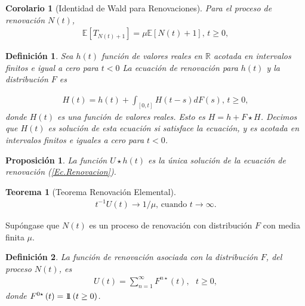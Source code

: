 \documentclass{article}
\newtheorem{Def}{Definición}
\newtheorem{Teo}{Teorema}
\newtheorem{Prop}{Proposición}
\newtheorem{Coro}{Corolario}
\newcommand{\rea}{\mathbb{R}}
\newcommand{\esp}{\mathbb{E}}
\newcommand{\indora}{\mbox{$1$\hspace{-0.8ex}$1$}}
\begin{document}
\begin{Coro}[Identidad de Wald para Renovaciones]
Para el proceso de renovaci\'on $N\left(t\right)$,
\begin{eqnarray*}
\esp\left[T_{N\left(t\right)+1}\right]=\mu\esp\left[N\left(t\right)+1\right]\textrm{,  }t\geq0,
\end{eqnarray*}  
\end{Coro}


\begin{Def}
Sea $h\left(t\right)$ funci\'on de valores reales en $\rea$ acotada en intervalos finitos e igual a cero para $t<0$ La ecuaci\'on de renovaci\'on para $h\left(t\right)$ y la distribuci\'on $F$ es

\begin{eqnarray}\label{Ec.Renovacion}
H\left(t\right)=h\left(t\right)+\int_{\left[0,t\right]}H\left(t-s\right)dF\left(s\right)\textrm{,    }t\geq0,
\end{eqnarray}
donde $H\left(t\right)$ es una funci\'on de valores reales. Esto es $H=h+F\star H$. Decimos que $H\left(t\right)$ es soluci\'on de esta ecuaci\'on si satisface la ecuaci\'on, y es acotada en intervalos finitos e iguales a cero para $t<0$.
\end{Def}

\begin{Prop}
La funci\'on $U\star h\left(t\right)$ es la \'unica soluci\'on de la ecuaci\'on de renovaci\'on (\ref{Ec.Renovacion}).
\end{Prop}

\begin{Teo}[Teorema Renovaci\'on Elemental]
\begin{eqnarray*}
t^{-1}U\left(t\right)\rightarrow 1/\mu\textrm{,    cuando }t\rightarrow\infty.
\end{eqnarray*}
\end{Teo}



Sup\'ongase que $N\left(t\right)$ es un proceso de renovaci\'on con distribuci\'on $F$ con media finita $\mu$.

\begin{Def}
La funci\'on de renovaci\'on asociada con la distribuci\'on $F$, del proceso $N\left(t\right)$, es
\begin{eqnarray*}
U\left(t\right)=\sum_{n=1}^{\infty}F^{n\star}\left(t\right),\textrm{   }t\geq0,
\end{eqnarray*}
donde $F^{0\star}\left(t\right)=\indora\left(t\geq0\right)$.
\end{Def}
\end{document}
